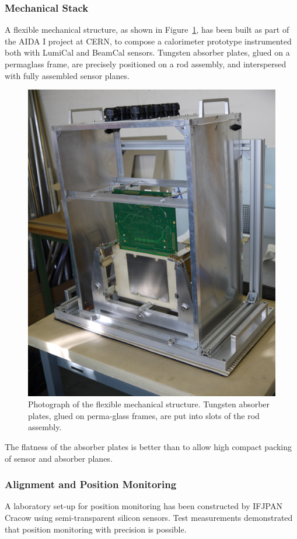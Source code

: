 \subsubsection{Mechanical Stack}

A flexible mechanical structure, as shown in  Figure~\ref{fig:mechanical_structure}, has been built as part of the AIDA I project at CERN,
to compose a calorimeter prototype instrumented both with LumiCal and BeamCal sensors. Tungsten absorber plates, glued on a permaglass
frame, are precisely
positioned on a rod assembly, and interspersed with fully assembled sensor planes.
\begin{figure}[hbp]
\centering
\includegraphics[width=0.6\columnwidth,]{Calorimeter/FCAL/figs/mechanical_structure_2}
\caption{Photograph of the flexible mechanical structure. Tungsten absorber plates, glued on perma-glass frames, are put into slots of the
rod assembly.}
\label{fig:mechanical_structure}
\end{figure}
The flatness of the absorber plates is better than \unit[50]{\micron} to allow high compact packing of sensor and absorber planes.

\subsubsection{Alignment and Position Monitoring }

A laboratory set-up for position monitoring has been constructed by IFJPAN Cracow using semi-transparent
silicon sensors. Test measurements demonstrated that position monitoring with \micron precision is possible.

